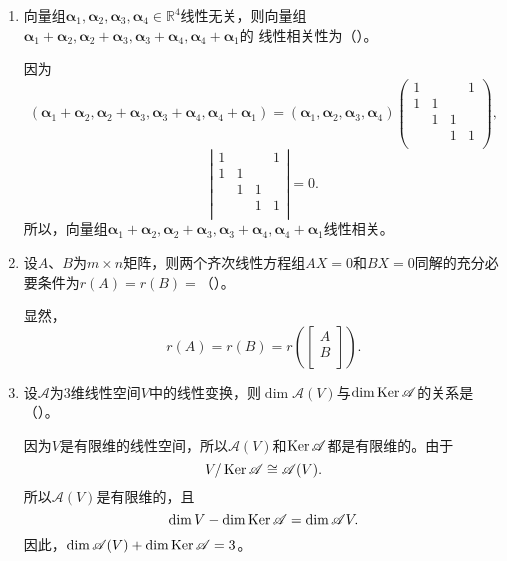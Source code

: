 \begin{enumerate}[1~]
\begin{enumerate}[1.~]
\item
向量组$\boldsymbol{\alpha} _ { 1 } ,  \boldsymbol{\alpha} _ { 2 } ,  \boldsymbol{\alpha} _ { 3 } ,  \boldsymbol{\alpha} _ { 4 } \in \mathbb{R} ^ { 4 }$线性无关，则向量组$\boldsymbol{\alpha} _ { 1 } + \boldsymbol{\alpha} _ { 2 } ,  \boldsymbol{\alpha} _ { 2 } + \boldsymbol{\alpha} _ { 3 } ,  \boldsymbol{\alpha} _ { 3 } + \boldsymbol{\alpha} _ { 4 } ,  \boldsymbol{\alpha} _ { 4 } + \boldsymbol{\alpha} _ { 1 }$的
线性相关性为（\quad）。
\begin{solution}
因为\[
(\boldsymbol{\alpha} _ { 1 } + \boldsymbol{\alpha} _ { 2 } , \boldsymbol{\alpha} _ { 2 } + \boldsymbol{\alpha} _ { 3 } , \boldsymbol{\alpha} _ { 3 } + \boldsymbol{\alpha} _ { 4 } ,  \boldsymbol{\alpha} _ { 4 } + \boldsymbol{\alpha} _ { 1 })=(\boldsymbol{\alpha} _ { 1 } , \boldsymbol{\alpha} _ { 2 } , \boldsymbol{\alpha} _ { 3 } , \boldsymbol{\alpha} _ { 4 })\left( \begin{matrix}
	1&		&		&		1\\
	1&		1&		&		\\
	&		1&		1&		\\
	&		&		1&		1\\
\end{matrix} \right) ,
\]
\[
\left| \begin{matrix}
	1&		&		&		1\\
	1&		1&		&		\\
	&		1&		1&		\\
	&		&		1&		1\\
\end{matrix} \right|=0.
\]
所以，向量组$\boldsymbol{\alpha} _ { 1 } + \boldsymbol{\alpha} _ { 2 } ,  \boldsymbol{\alpha} _ { 2 } + \boldsymbol{\alpha} _ { 3 } ,  \boldsymbol{\alpha} _ { 3 } + \boldsymbol{\alpha} _ { 4 } ,  \boldsymbol{\alpha} _ { 4 } + \boldsymbol{\alpha} _ { 1 }$线性相关。
\end{solution}

\item
设$A$、$B$为$m\times n$矩阵，则两个齐次线性方程组$AX =0$和$BX=0$同解的充分必要条件为$ r(A)=r(B)=$（\quad）。
\begin{solution}
显然，\[
r(A)=r(B)=r\left(\left[ \begin{array}{c}
	A\\
	B\\
\end{array} \right] \right).
\]
\end{solution}

\item
设$\mathscr{A}$为$3$维线性空间$V$中的线性变换，则$\dim \mathscr{A}(V)$与$\dim\operatorname{Ker}\mathscr{A}$的关系是（\quad）。
\begin{solution}
因为$V$是有限维的线性空间，所以$\mathscr{A}(V)$和$\operatorname{Ker}\mathscr{A}$都是有限维的。由于\[
V/\operatorname{Ker}\mathscr{A}\cong\mathscr{A}(V).
\]
所以$\mathscr{A}(V)$是有限维的，且\[
\dim V-\dim\operatorname{Ker}\mathscr{A}=\dim\mathscr{A}V.
\]
因此，$\dim\mathscr{A}(V)+\dim\operatorname{Ker}\mathscr{A}=3$。
\end{solution}


\end{enumerate}
\end{enumerate}
